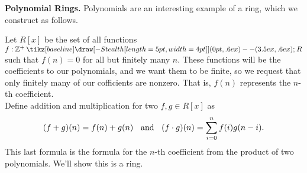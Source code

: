 \documentclass[12pt,letterpaper]{algebra_book}
\renewcommand{\to}{\mathbin{\tikz[baseline] \draw[-{Stealth[length=5pt,width=4pt]}] (0pt,.6ex) -- (3.5ex,.6ex);}}
\newcommand{\ZZ}{\mathbb{Z}}
\theoremstyle{definition}
\begin{document}
    \textcolor{Red!70!Blue}{
    \textbf{Polynomial Rings.}
    Polynomials are an interesting example of a ring, which we
    construct as follows.}
    
    \indent Let $R[x]$ be the set of all functions
    $f: \ZZ^+ \to R$ such that $f(n) = 0$ for all but finitely
    many $n$. These functions will be the coefficients to our
    polynomials, and we want them to be finite, so we request that
    only finitely many of our cofficients are nonzero.
    That is, $f(n)$ represents the $n$-th coefficient.
    \\

    \noindent Define addition and multiplication for two $f, g \in R[x]$ as 
    \[
        (f + g)(n) = f(n) + g(n) \hspace{0.2cm}\text{ and }\hspace{0.2cm}  (f \cdot g)(n) =
        \sum_{i = 0}^{n}f(i)g(n - i).
    \] 
    This last formula is the formula for the
    $n$-th coefficient from the product of two polynomials. We'll
    show this is a ring.
\end{document}
